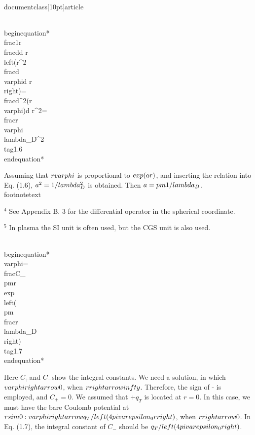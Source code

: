 \\documentclass[10pt]{article}
\begin{document}
\\begin{equation*}
\\frac{1}{r} \\frac{d}{d r}\\left(r^{2} \\frac{d \\varphi}{d r}\\right)=\\frac{d^{2}(r \\varphi)}{d r^{2}}=\\frac{r \\varphi}{\\lambda_{D}^{2}} \\tag{1.6}
\\end{equation*}


Assuming that $r \\varphi$ is proportional to $\\exp (a r)$, and inserting the relation into Eq. (1.6), $a^{2}=1 / \\lambda_{D}^{2}$ is obtained. Then $a= \\pm 1 / \\lambda_{D}$.
\\footnotetext{${ }^{4}$ See Appendix B. 3 for the differential operator in the spherical coordinate.

${ }^{5}$ In plasma the SI unit is often used, but the CGS unit is also used.
}


\\begin{equation*}
\\varphi=\\frac{C_{ \\pm}}{r} \\exp \\left( \\pm \\frac{r}{\\lambda_{D}}\\right) \\tag{1.7}
\\end{equation*}


Here $C_{+}$and $C_{-}$show the integral constants. We need a solution, in which $\\varphi \\rightarrow 0$, when $r \\rightarrow \\infty$. Therefore, the sign of - is employed, and $C_{+}=0$. We assumed that $+q_{T}$ is located at $r=0$. In this case, we must have the bare Coulomb potential at $r \\sim 0: \\varphi \\rightarrow q_{T} /\\left(4 \\pi \\varepsilon_{0} r\\right)$, when $r \\rightarrow 0$. In Eq. (1.7), the integral constant of $C_{-}$ should be $q_{T} /\\left(4 \\pi \\varepsilon_{0}\\right)$.
\end{document}
